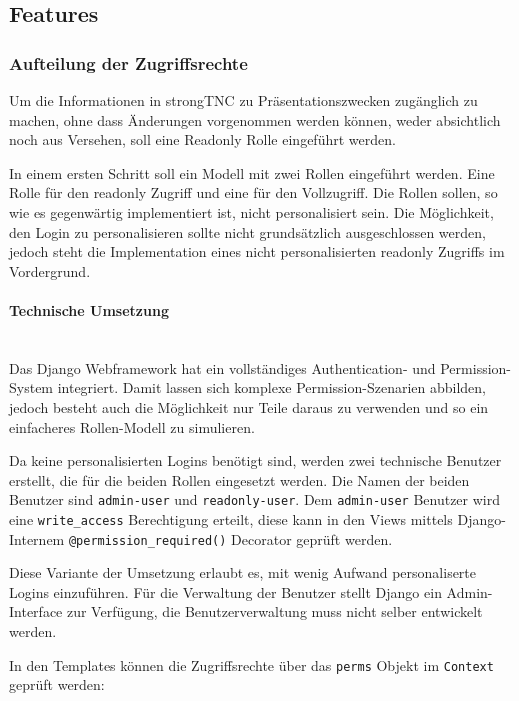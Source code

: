 \subsection{Features}

\subsubsection{Aufteilung der Zugriffsrechte}
Um die Informationen in strongTNC zu Präsentationszwecken zugänglich zu machen,
ohne dass Änderungen vorgenommen werden können, weder absichtlich noch aus
Versehen, soll eine Readonly Rolle eingeführt werden.

In einem ersten Schritt soll ein Modell mit zwei Rollen eingeführt werden. Eine
Rolle für den readonly Zugriff und eine für den Vollzugriff. Die Rollen sollen,
so wie es gegenwärtig implementiert ist, nicht personalisiert sein. Die
Möglichkeit, den Login zu personalisieren sollte nicht grundsätzlich
ausgeschlossen werden, jedoch steht die Implementation eines nicht
personalisierten readonly Zugriffs im Vordergrund.

\paragraph{Technische Umsetzung} \hspace{0pt} \\
Das Django Webframework hat ein vollständiges Authentication- und
Permission-System integriert. Damit lassen sich komplexe Permission-Szenarien
abbilden, jedoch besteht auch die Möglichkeit nur Teile daraus zu verwenden und
so ein einfacheres Rollen-Modell zu simulieren.

Da keine personalisierten Logins benötigt sind, werden zwei technische Benutzer
erstellt, die für die beiden Rollen eingesetzt werden. Die Namen der beiden Benutzer sind 
 \texttt{admin-user} und \texttt{readonly-user}. Dem
\texttt{admin-user} Benutzer wird eine \texttt{write\_access} Berechtigung erteilt, diese
kann in den Views mittels Django-Internem \texttt{@permission\_required()}
Decorator geprüft werden.

Diese Variante der Umsetzung erlaubt es, mit wenig Aufwand personaliserte Logins
einzuführen. Für die Verwaltung der Benutzer stellt Django ein Admin-Interface
zur Verfügung, die Benutzerverwaltung muss nicht selber entwickelt werden.

In den Templates können die Zugriffsrechte über das \texttt{perms} Objekt im
\texttt{Context} geprüft werden:


